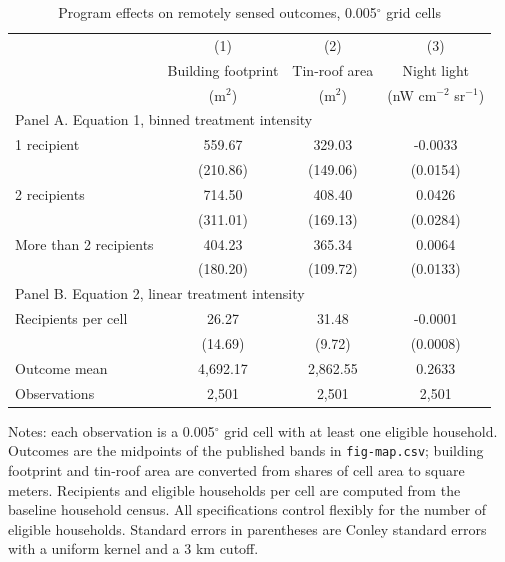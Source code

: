 \begin{table}[htbp]
\centering
\caption{Program effects on remotely sensed outcomes, 0.005$^\circ$ grid cells}
\label{tab:eq1-figmap}
\begin{tabular}{lccc}
\hline\hline
 & (1) & (2) & (3) \\
 & Building footprint & Tin-roof area & Night light \\
 & (m$^2$) & (m$^2$) & (nW cm$^{-2}$ sr$^{-1}$) \\
\hline
\multicolumn{4}{l}{Panel A. Equation 1, binned treatment intensity} \\
1 recipient & 559.67 & 329.03 & -0.0033 \\
 & (210.86) & (149.06) & (0.0154) \\
2 recipients & 714.50 & 408.40 & 0.0426 \\
 & (311.01) & (169.13) & (0.0284) \\
More than 2 recipients & 404.23 & 365.34 & 0.0064 \\
 & (180.20) & (109.72) & (0.0133) \\
\hline
\multicolumn{4}{l}{Panel B. Equation 2, linear treatment intensity} \\
Recipients per cell & 26.27 & 31.48 & -0.0001 \\
 & (14.69) & (9.72) & (0.0008) \\
\hline
Outcome mean & 4,692.17 & 2,862.55 & 0.2633 \\
Observations & 2,501 & 2,501 & 2,501 \\
\hline\hline
\end{tabular}
\begin{minipage}{\textwidth}
\footnotesize
Notes: each observation is a 0.005$^\circ$ grid cell with at least one eligible household. Outcomes are the midpoints of the published bands in \texttt{fig-map.csv}; building footprint and tin-roof area are converted from shares of cell area to square meters. Recipients and eligible households per cell are computed from the baseline household census. All specifications control flexibly for the number of eligible households. Standard errors in parentheses are Conley standard errors with a uniform kernel and a 3 km cutoff.
\end{minipage}
\end{table}
